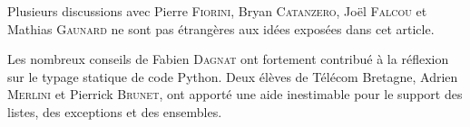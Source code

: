 \documentclass[renpar]{compas2013}
\begin{document}
Plusieurs discussions avec Pierre \textsc{Fiorini}, Bryan
\textsc{Catanzero}, Joël \textsc{Falcou} et Mathias \textsc{Gaunard} ne
sont pas étrangères aux idées exposées dans cet article.

Les nombreux conseils de Fabien \textsc{Dagnat} ont fortement contribué à
la réflexion sur le typage statique de code Python. Deux élèves de Télécom
Bretagne, Adrien \textsc{Merlini} et Pierrick \textsc{Brunet}, ont apporté
une aide inestimable pour le support des listes, des exceptions et des
ensembles.


\end{document}

